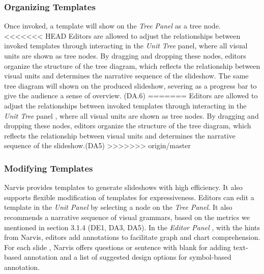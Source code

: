 \subsubsection{Organizing Templates} 
Once invoked, a template will show on the \textit{Tree Panel} as a tree node. 
<<<<<<< HEAD
Editors are allowed to adjust the relationships between invoked templates through interacting in the \textit{Unit Tree} panel, where all visual units are shown as tree nodes.
By dragging and dropping these nodes, editors organize the structure of the tree diagram, which reflects the relationship between visual units and determines the narrative sequence of the slideshow. The same tree diagram will shown on the produced slideshow, severing as a progress bar to give the audience a sense of overview. (DA.6)
=======
Editors are allowed to adjust the relationships between invoked templates through interacting in the \textit{Unit Tree} panel , where all visual units are shown as tree nodes.
By dragging and dropping these nodes, editors organize the structure of the tree diagram, which reflects the relationship between visual units and determines the narrative sequence of the slideshow.(DA5) 
>>>>>>> origin/master

\subsubsection{Modifying Templates} 
Narvis provides templates to generate slideshows with high efficiency. 
It also supports flexible modification of templates for expressiveness.
Editors can edit a template in the \textit{Unit Panel} by selecting a node on the \textit{Tree Panel}.  
It also recommends a narrative sequence of visual grammars, based on the metrics we mentioned in section 3.1.4 (DE1, DA3, DA5). 
In the \textit{Editor Panel} , with the hints from Narvis, editors add annotations to facilitate graph and chart comprehension. For each slide , Narvis offers questions or sentence with blank for adding text-based annotation and a list of suggested design options for symbol-based annotation. 

